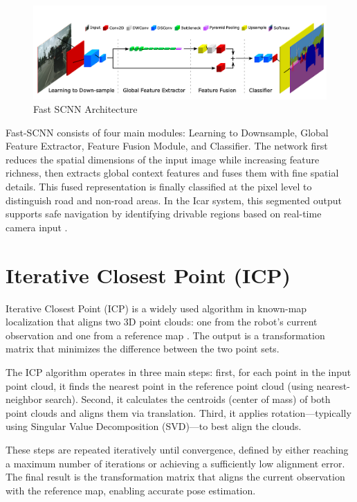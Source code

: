 \begin{figure}[H]
	\centering
	\includegraphics[width=\linewidth]{../konten/fast_scnn.png}
	\caption{Fast SCNN Architecture \cite{ref_fast_scnn}}
	\label{fig:fast_scnn_architecture}
\end{figure} 

Fast-SCNN consists of four main modules: Learning to Downsample, Global Feature Extractor, Feature Fusion Module, and Classifier. The network first reduces the spatial dimensions of the input image while increasing feature richness, then extracts global context features and fuses them with fine spatial details. This fused representation is finally classified at the pixel level to distinguish road and non-road areas. In the Icar system, this segmented output supports safe navigation by identifying drivable regions based on real-time camera input \cite{ref_fast_scnn}.

\section{Iterative Closest Point (ICP)}
Iterative Closest Point (ICP) is a widely used algorithm in known-map localization that aligns two 3D point clouds: one from the robot's current observation and one from a reference map \cite{ref_icp}. The output is a transformation matrix that minimizes the difference between the two point sets.

\par
The ICP algorithm operates in three main steps: first, for each point in the input point cloud, it finds the nearest point in the reference point cloud (using nearest-neighbor search). Second, it calculates the centroids (center of mass) of both point clouds and aligns them via translation. Third, it applies rotation—typically using Singular Value Decomposition (SVD)—to best align the clouds.

\par
These steps are repeated iteratively until convergence, defined by either reaching a maximum number of iterations or achieving a sufficiently low alignment error. The final result is the transformation matrix that aligns the current observation with the reference map, enabling accurate pose estimation.

